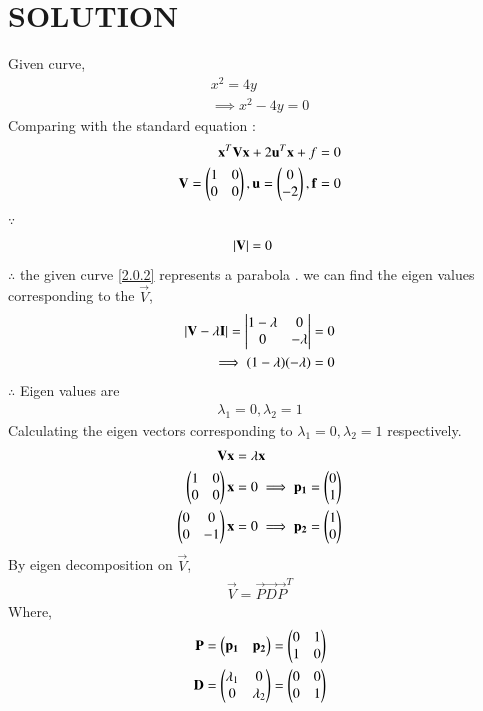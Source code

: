 \documentclass[journal,12pt,twocolumn]{IEEEtran}
\begin{document}
\section{SOLUTION} 
Given curve,
\begin{align}
x^2=4y\\
\implies x^2-4y =0 \label{2.0.2}
\end{align}
Comparing with the standard equation :
\begin{align}
\mathbf{x}^T\mathbf{V}\mathbf{x}+2\mathbf{u}^T\mathbf{x}+f=0\\
\mathbf{V}=\begin{pmatrix}1 & 0 \\ 0 & 0\end{pmatrix},\mathbf{u}=\begin{pmatrix}0 \\ -2 \end{pmatrix}, \mathbf{f} = 0 
\end{align}
$\because$
\begin{align}
 \left\vert\mathbf{V}\right\vert &= 0
\end{align}
$\therefore$ the given curve \eqref{2.0.2} represents a parabola .
we can find the eigen values corresponding to the $\vec{V}$,
\begin{align}
\left\vert\mathbf{V} - \lambda\mathbf{I}\right\vert = \begin{vmatrix}1-\lambda & 0 \\ 0 & -\lambda\end{vmatrix} &= 0
\\
\implies (1- \lambda)(-\lambda) &= 0
\end{align}
$\therefore$ Eigen values are 
\begin{align}
\lambda_1 = 0 , \lambda_2 = 1
\end{align}
Calculating the eigen vectors corresponding to $\lambda_1 = 0 , \lambda_2 = 1$ respectively.
\begin{align}
\mathbf{V}\mathbf{x} &= \lambda\mathbf{x}
\\
\begin{pmatrix}1 & 0 \\ 0 & 0\end{pmatrix}\mathbf{x} &=0 \implies \mathbf{p_1} = \begin{pmatrix}0 \\ 1\end{pmatrix}
\\
\begin{pmatrix}0 & 0 \\ 0 & -1\end{pmatrix}\mathbf{x} &=0 \implies \mathbf{p_2} = \begin{pmatrix}1 \\ 0\end{pmatrix}
\end{align}
 By eigen decomposition on $\vec{V}$,
\begin{align}
\vec{V}=\vec{P}\vec{D}\vec{P}^T
\end{align}
Where,
\begin{align}
\mathbf{P} &= \begin{pmatrix}\mathbf{p_1} & \mathbf{p_2}\end{pmatrix} = \begin{pmatrix}0 & 1 \\ 1 & 0\end{pmatrix}
\\
\mathbf{D} &= \begin{pmatrix}\lambda_1 & 0 \\ 0 & \lambda_2\end{pmatrix} =\begin{pmatrix}0 & 0 \\ 0 & 1\end{pmatrix} 
\end{align}
\end{document}

